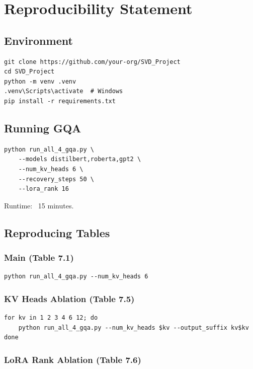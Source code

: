 
\section{Reproducibility Statement}

\subsection{Environment}

\begin{lstlisting}
git clone https://github.com/your-org/SVD_Project
cd SVD_Project
python -m venv .venv
.venv\Scripts\activate  # Windows
pip install -r requirements.txt
\end{lstlisting}

\subsection{Running GQA}

\begin{lstlisting}
python run_all_4_gqa.py \
    --models distilbert,roberta,gpt2 \
    --num_kv_heads 6 \
    --recovery_steps 50 \
    --lora_rank 16
\end{lstlisting}

Runtime: ~15 minutes.

\subsection{Reproducing Tables}

\subsubsection{Main (Table 7.1)}

\begin{lstlisting}
python run_all_4_gqa.py --num_kv_heads 6
\end{lstlisting}

\subsubsection{KV Heads Ablation (Table 7.5)}

\begin{lstlisting}
for kv in 1 2 3 4 6 12; do
    python run_all_4_gqa.py --num_kv_heads $kv --output_suffix kv$kv
done
\end{lstlisting}

\subsubsection{LoRA Rank Ablation (Table 7.6)}

